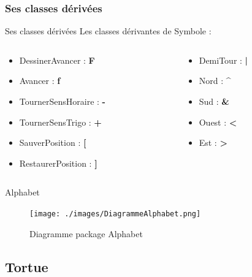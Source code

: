 \documentclass{beamer}
\begin{document}
\subsubsection{Ses classes dérivées}
\begin{frame}{Ses classes dérivées}
Les classes dérivantes de Symbole :
    \begin{columns}[T]
        \begin{column}{0.5\textwidth}
            \begin{itemize}
            	\item DessinerAvancer : \textbf{F}
            	\item Avancer : \textbf{f}
            	\item TournerSensHoraire : \textbf{-}
            	\item TournerSensTrigo : \textbf{+} 
            	\item SauverPosition : \textbf{[} 
            	\item RestaurerPosition : \textbf{]} 
            \end{itemize}
        \end{column}
        \begin{column}{0.5\textwidth}
            \begin{itemize}
            	\item DemiTour : \textbf{|} 
            	\item Nord : \textbf{\^}
            	\item Sud : \textbf{\&} 
            	\item Ouest : \textbf{<}
            	\item Est : \textbf{>}
            \end{itemize}
        \end{column}
    \end{columns}
\end{frame}
\begin{frame}{Alphabet}
    \begin{figure}[h]
	   \texttt{[image: ./images/DiagrammeAlphabet.png]}
	   \caption{Diagramme package Alphabet}
    \end{figure}
\end{frame}


\subsection{Tortue}
\end{document}
